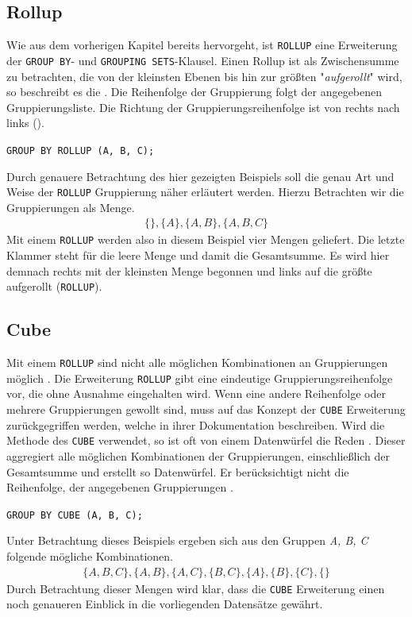 \subsection{Rollup}
\label{subsec:rollup} Wie aus dem vorherigen Kapitel bereits hervorgeht, ist \texttt{ROLLUP}
eine Erweiterung der \texttt{GROUP BY}- und \texttt{GROUPING SETS}-Klausel.
Einen Rollup ist als Zwischensumme zu betrachten, die von der kleinsten Ebenen bis
hin zur größten "\textit{aufgerollt}" wird, so beschreibt es die \citet{oracle99}.
Die Reihenfolge der Gruppierung folgt der angegebenen Gruppierungsliste. Die
Richtung der Gruppierungsreihenfolge ist von rechts nach links (\cite{oracle16}).

\texttt{GROUP BY ROLLUP (A, B, C);}

Durch genauere Betrachtung des hier gezeigten Beispiels soll die genau Art und
Weise der \texttt{ROLLUP} Gruppierung näher erläutert werden. Hierzu Betrachten
wir die Gruppierungen als Menge.
\begin{align*}
	\{ \}, \{A\}, \{A, B\}, \{A, B, C\}
\end{align*}
Mit einem \texttt{ROLLUP} werden also in diesem Beispiel vier Mengen geliefert. Die
letzte Klammer steht für die leere Menge und damit die Gesamtsumme. Es wird hier
demnach rechts mit der kleinsten Menge begonnen und links auf die größte
aufgerollt (\texttt{ROLLUP}).

\subsection{Cube}
\label{subsec:cube} Mit einem \texttt{ROLLUP} sind nicht alle möglichen
Kombinationen an Gruppierungen möglich \citep{oracle99}. Die Erweiterung \texttt{ROLLUP}
gibt eine eindeutige Gruppierungsreihenfolge vor, die ohne Ausnahme eingehalten
wird. Wenn eine andere Reihenfolge oder mehrere Gruppierungen gewollt sind, muss
auf das Konzept der \texttt{CUBE} Erweiterung zurückgegriffen werden, welche
\citet{oracle99} in ihrer Dokumentation beschreiben. Wird die Methode des
\texttt{CUBE} verwendet, so ist oft von einem Datenwürfel die Reden \citep{oracle99}.
Dieser aggregiert alle möglichen Kombinationen der Gruppierungen, einschließlich
der Gesamtsumme und erstellt so Datenwürfel. Er berücksichtigt nicht die
Reihenfolge, der angegebenen Gruppierungen \citep{oracle99}.

\texttt{GROUP BY CUBE (A, B, C);}

Unter Betrachtung dieses Beispiels ergeben sich aus den Gruppen \textit{A, B, C}
folgende mögliche Kombinationen.
\begin{align*}
	\{ A, B, C\}, \{A, B\}, \{A, C\}, \{B, C\}, \{A\}, \{B\}, \{C\}, \{ \}
\end{align*}
Durch Betrachtung dieser Mengen wird klar, dass die \texttt{CUBE} Erweiterung
einen noch genaueren Einblick in die vorliegenden Datensätze gewährt.
